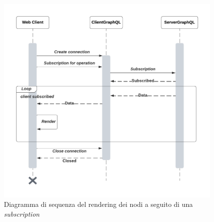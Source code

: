 \begin{figure}
	\centering
	\includegraphics[width=.65\linewidth]{imgs/Rendering_Diagramma_Sequenza.pdf}
	\caption{Diagramma di sequenza del rendering dei nodi a seguito di una \textit{subscription}}
	\label{fig:rendering-graphics}
\end{figure}

